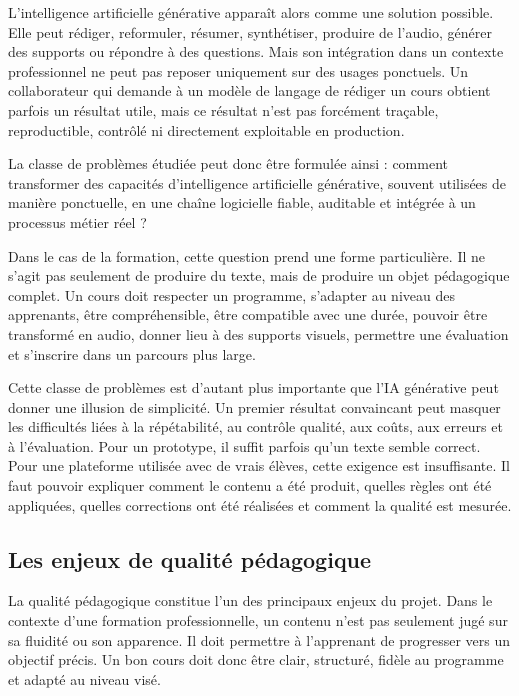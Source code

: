 L'intelligence artificielle générative apparaît alors comme une solution possible. Elle peut
rédiger, reformuler, résumer, synthétiser, produire de l'audio, générer des supports ou
répondre à des questions. Mais son intégration dans un contexte professionnel ne peut
pas reposer uniquement sur des usages ponctuels. Un collaborateur qui demande à un
modèle de langage de rédiger un cours obtient parfois un résultat utile, mais ce résultat
n'est pas forcément traçable, reproductible, contrôlé ni directement exploitable en
production.

La classe de problèmes étudiée peut donc être formulée ainsi : comment transformer des
capacités d'intelligence artificielle générative, souvent utilisées de manière ponctuelle,
en une chaîne logicielle fiable, auditable et intégrée à un processus métier réel ?

Dans le cas de la formation, cette question prend une forme particulière. Il ne s'agit pas
seulement de produire du texte, mais de produire un objet pédagogique complet. Un cours
doit respecter un programme, s'adapter au niveau des apprenants, être compréhensible,
être compatible avec une durée, pouvoir être transformé en audio, donner lieu à des
supports visuels, permettre une évaluation et s'inscrire dans un parcours plus large.

Cette classe de problèmes est d'autant plus importante que l'IA générative peut donner
une illusion de simplicité. Un premier résultat convaincant peut masquer les difficultés
liées à la répétabilité, au contrôle qualité, aux coûts, aux erreurs et à l'évaluation. Pour
un prototype, il suffit parfois qu'un texte semble correct. Pour une plateforme utilisée
avec de vrais élèves, cette exigence est insuffisante. Il faut pouvoir expliquer comment le
contenu a été produit, quelles règles ont été appliquées, quelles corrections ont été
réalisées et comment la qualité est mesurée.

\subsection{Les enjeux de qualité pédagogique}

La qualité pédagogique constitue l'un des principaux enjeux du projet. Dans le contexte
d'une formation professionnelle, un contenu n'est pas seulement jugé sur sa fluidité ou
son apparence. Il doit permettre à l'apprenant de progresser vers un objectif précis. Un
bon cours doit donc être clair, structuré, fidèle au programme et adapté au niveau visé.

